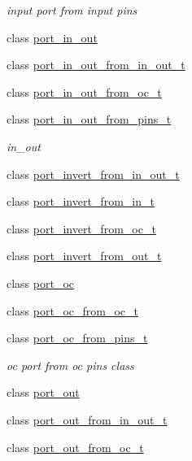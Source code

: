 \begin{DoxyCompactItemize}
\begin{DoxyCompactList}\small\item\em input port from input pins \end{DoxyCompactList}\item 
class \hyperlink{classhwlib_1_1port__in__out}{port\+\_\+in\+\_\+out}
\item 
class \hyperlink{classhwlib_1_1port__in__out__from__in__out__t}{port\+\_\+in\+\_\+out\+\_\+from\+\_\+in\+\_\+out\+\_\+t}
\item 
class \hyperlink{classhwlib_1_1port__in__out__from__oc__t}{port\+\_\+in\+\_\+out\+\_\+from\+\_\+oc\+\_\+t}
\item 
class \hyperlink{classhwlib_1_1port__in__out__from__pins__t}{port\+\_\+in\+\_\+out\+\_\+from\+\_\+pins\+\_\+t}
\begin{DoxyCompactList}\small\item\em in\+\_\+out \end{DoxyCompactList}\item 
class \hyperlink{classhwlib_1_1port__invert__from__in__out__t}{port\+\_\+invert\+\_\+from\+\_\+in\+\_\+out\+\_\+t}
\item 
class \hyperlink{classhwlib_1_1port__invert__from__in__t}{port\+\_\+invert\+\_\+from\+\_\+in\+\_\+t}
\item 
class \hyperlink{classhwlib_1_1port__invert__from__oc__t}{port\+\_\+invert\+\_\+from\+\_\+oc\+\_\+t}
\item 
class \hyperlink{classhwlib_1_1port__invert__from__out__t}{port\+\_\+invert\+\_\+from\+\_\+out\+\_\+t}
\item 
class \hyperlink{classhwlib_1_1port__oc}{port\+\_\+oc}
\item 
class \hyperlink{classhwlib_1_1port__oc__from__oc__t}{port\+\_\+oc\+\_\+from\+\_\+oc\+\_\+t}
\item 
class \hyperlink{classhwlib_1_1port__oc__from__pins__t}{port\+\_\+oc\+\_\+from\+\_\+pins\+\_\+t}
\begin{DoxyCompactList}\small\item\em oc port from oc pins class \end{DoxyCompactList}\item 
class \hyperlink{classhwlib_1_1port__out}{port\+\_\+out}
\item 
class \hyperlink{classhwlib_1_1port__out__from__in__out__t}{port\+\_\+out\+\_\+from\+\_\+in\+\_\+out\+\_\+t}
\item 
class \hyperlink{classhwlib_1_1port__out__from__oc__t}{port\+\_\+out\+\_\+from\+\_\+oc\+\_\+t}
\item 

\end{DoxyCompactItemize}
